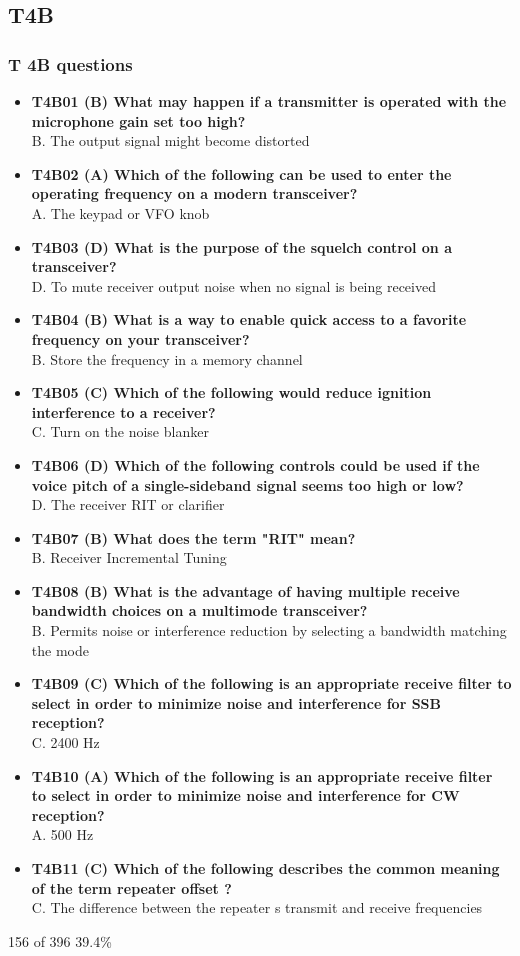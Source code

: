\documentclass[10pt]{beamer}
\begin{document}
\subsection{T4B}
\begin{frame}
\frametitle{T 4B questions}
\begin{itemize}[<+->]
\tiny
\item\textbf{T4B01 (B) What may happen if a transmitter is operated with the microphone gain set too high?}\\ B. The output signal might become distorted
\item\textbf{T4B02 (A) Which of the following can be used to enter the operating frequency on a modern transceiver?}\\ A. The keypad or VFO knob
\item\textbf{T4B03 (D) What is the purpose of the squelch control on a transceiver?}\\ D. To mute receiver output noise when no signal is being received
\item\textbf{T4B04 (B) What is a way to enable quick access to a favorite frequency on your transceiver?}\\ B. Store the frequency in a memory channel
\item\textbf{T4B05 (C) Which of the following would reduce ignition interference to a receiver?}\\ C. Turn on the noise blanker
\item\textbf{T4B06 (D) Which of the following controls could be used if the voice pitch of a single-sideband signal seems too high or low?}\\ D. The receiver RIT or clarifier
\item\textbf{T4B07 (B) What does the term "RIT" mean?}\\ B. Receiver Incremental Tuning
\item\textbf{T4B08 (B) What is the advantage of having multiple receive bandwidth choices on a multimode transceiver?}\\ B. Permits noise or interference reduction by selecting a bandwidth matching the mode
\item\textbf{T4B09 (C) Which of the following is an appropriate receive filter to select in order to minimize noise and interference for SSB reception?}\\ C. 2400 Hz
\item\textbf{T4B10 (A) Which of the following is an appropriate receive filter to select in order to minimize noise and interference for CW reception?}\\ A. 500 Hz
\item\textbf{T4B11 (C) Which of the following describes the common meaning of the term  repeater offset ?}\\ C. The difference between the repeater s transmit and receive frequencies
\end{itemize}
\tiny 156 of 396  39.4\%
\end{frame}
\end{document}
